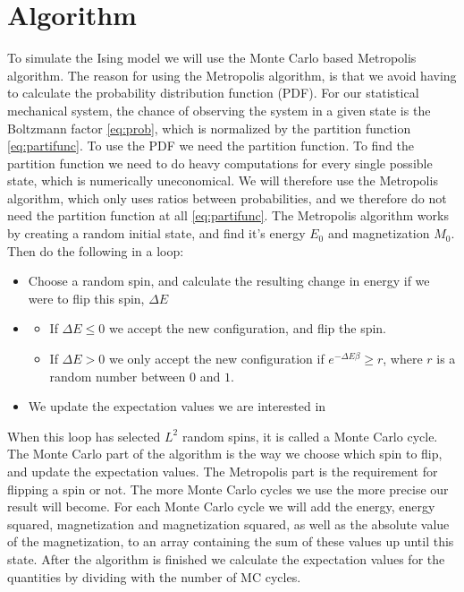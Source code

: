 \documentclass[%
 reprint,
nofootinbib,
aps,
]{revtex4-1}
\begin{document}
\section{Algorithm}\label{sec:algorithms}
To simulate the Ising model we will use the Monte Carlo based Metropolis algorithm. The reason for using the Metropolis algorithm, is that we avoid having to calculate the probability distribution function (PDF). For our statistical mechanical system, the chance of observing the system in a given state is the Boltzmann factor \eqref{eq:prob}, which is normalized by the partition function \eqref{eq:partifunc}. To use the PDF we need the partition function.  To find the partition function we need to do heavy computations for every single possible state, which is numerically uneconomical. We will therefore use the Metropolis algorithm, which only uses ratios between probabilities, and we therefore do not need the partition function at all  \eqref{eq:partifunc}. The Metropolis algorithm works by creating a random initial state, and find it's energy $E_0$ and magnetization $M_0$. Then do the following in a loop:
\begin{itemize}
    \item Choose a random spin, and calculate the resulting change in energy if we were to flip this spin, $\Delta E$
    \item \begin{itemize}
        \item If $\Delta E \leq 0$ we accept the new configuration, and flip the spin.
        \item If $\Delta E > 0$ we only accept the new configuration if $e^{-\Delta E\beta}\geq r$, where $r$ is a random number between $0$ and $1$.
    \end{itemize}
    \item We update the expectation values we are interested in
\end{itemize}
When this loop has selected $L^2$ random spins, it is called a Monte Carlo cycle. The Monte Carlo part of the algorithm is the way we choose which spin to flip, and update the expectation values. The Metropolis part is the requirement for flipping a spin or not. The more Monte Carlo cycles we use the more precise our result will become. For each Monte Carlo cycle we will add the energy, energy squared, magnetization and magnetization squared, as well as the absolute value of the magnetization, to an array containing the sum of these values up until this state. After the algorithm is finished we calculate the expectation values for the quantities by dividing with the number of MC cycles.
\end{document}
